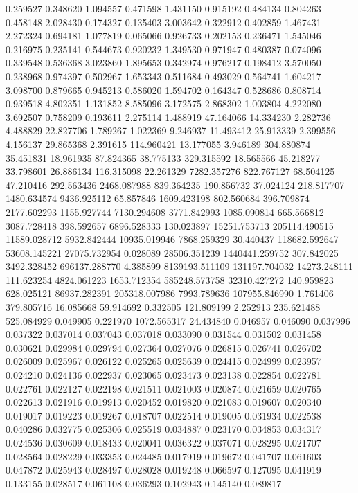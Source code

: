0.259527
0.348620
1.094557
0.471598
1.431150
0.915192
0.484134
0.804263
0.458148
2.028430
0.174327
0.135403
3.003642
0.322912
0.402859
1.467431
2.272324
0.694181
1.077819
0.065066
0.926733
0.202153
0.236471
1.545046
0.216975
0.235141
0.544673
0.920232
1.349530
0.971947
0.480387
0.074096
0.339548
0.536368
3.023860
1.895653
0.342974
0.976217
0.198412
3.570050
0.238968
0.974397
0.502967
1.653343
0.511684
0.493029
0.564741
1.604217
3.098700
0.879665
0.945213
0.586020
1.594702
0.164347
0.528686
0.808714
0.939518
4.802351
1.131852
8.585096
3.172575
2.868302
1.003804
4.222080
3.692507
0.758209
0.193611
2.275114
1.488919
47.164066
14.334230
2.282736
4.488829
22.827706
1.789267
1.022369
9.246937
11.493412
25.913339
2.399556
4.156137
29.865368
2.391615
114.960421
13.177055
3.946189
304.880874
35.451831
18.961935
87.824365
38.775133
329.315592
18.565566
45.218277
33.798601
26.886134
116.315098
22.261329
7282.357276
822.767127
68.504125
47.210416
292.563436
2468.087988
839.364235
190.856732
37.024124
218.817707
1480.634574
9436.925112
65.857846
1609.423198
802.560684
396.709874
2177.602293
1155.927744
7130.294608
3771.842993
1085.090814
665.566812
3087.728418
398.592657
6896.528333
130.023897
15251.753713
205114.490515
11589.028712
5932.842444
10935.019946
7868.259329
30.440437
118682.592647
53608.145221
27075.732954
0.028089
28506.351239
1440441.259752
307.842025
3492.328452
696137.288770
4.385899
8139193.511109
131197.704032
14273.248111
111.623254
4824.061223
1653.712354
585248.573758
32310.427272
140.959823
628.025121
86937.282391
205318.007986
7993.789636
107955.846990
1.761406
379.805716
16.085668
59.914692
0.332505
121.809199
2.252913
235.621488
525.084929
0.049905
0.221970
1072.565317
24.434840
0.046957
0.046090
0.037996
0.037322
0.037014
0.037043
0.037018
0.033090
0.031544
0.031502
0.031458
0.030621
0.029984
0.029794
0.027364
0.027076
0.026815
0.026741
0.026702
0.026009
0.025967
0.026122
0.025265
0.025639
0.024415
0.024999
0.023957
0.024210
0.024136
0.022937
0.023065
0.023473
0.023138
0.022854
0.022781
0.022761
0.022127
0.022198
0.021511
0.021003
0.020874
0.021659
0.020765
0.022613
0.021916
0.019913
0.020452
0.019820
0.021083
0.019607
0.020340
0.019017
0.019223
0.019267
0.018707
0.022514
0.019005
0.031934
0.022538
0.040286
0.032775
0.025306
0.025519
0.034887
0.023170
0.034853
0.034317
0.024536
0.030609
0.018433
0.020041
0.036322
0.037071
0.028295
0.021707
0.028564
0.028229
0.033353
0.024485
0.017919
0.019672
0.041707
0.061603
0.047872
0.025943
0.028497
0.028028
0.019248
0.066597
0.127095
0.041919
0.133155
0.028517
0.061108
0.036293
0.102943
0.145140
0.089817
